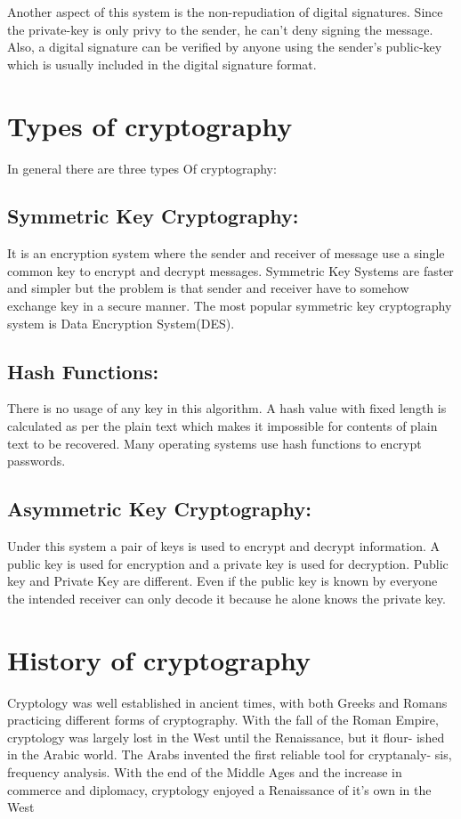 \documentclass{report}
\begin{document}
{{{Another aspect of this system is the non-repudiation of digital signatures. Since the private-key is only privy to the sender, he can’t deny signing the message. Also, a digital signature can be verified by anyone using the sender’s public-key which is usually included in the digital signature format.}
\section{Types of cryptography}
In general there are three types Of cryptography:
\subsection{Symmetric Key Cryptography:}
\Large{It is an encryption system where the sender and receiver of message use a single common key to encrypt and decrypt messages. Symmetric Key Systems are faster and simpler but the problem is that sender and receiver have to somehow exchange key in a secure manner. The most popular symmetric key cryptography system is Data Encryption System(DES).}
\subsection{Hash Functions:}
\Large{There is no usage of any key in this algorithm. A hash value with fixed length is calculated as per the plain text which makes it impossible for contents of plain text to be recovered. Many operating systems use hash functions to encrypt passwords.}

\subsection{Asymmetric Key Cryptography:}
\Large{Under this system a pair of keys is used to encrypt and decrypt information. A public key is used for encryption and a private key is used for decryption. Public key and Private Key are different. Even if the public key is known by everyone the intended receiver can only decode it because he alone knows the private key.}


\section{History of cryptography}
\Large{Cryptology was well established in ancient times, with both Greeks and
Romans practicing different forms of cryptography. With the fall of the Roman
Empire, cryptology was largely lost in the West until the Renaissance, but it flour-
ished in the Arabic world. The Arabs invented the first reliable tool for cryptanaly-
sis, frequency analysis. With the end of the Middle Ages and the increase in
commerce and diplomacy, cryptology enjoyed a Renaissance of it’s own in the
West


}}}
\end{document}
